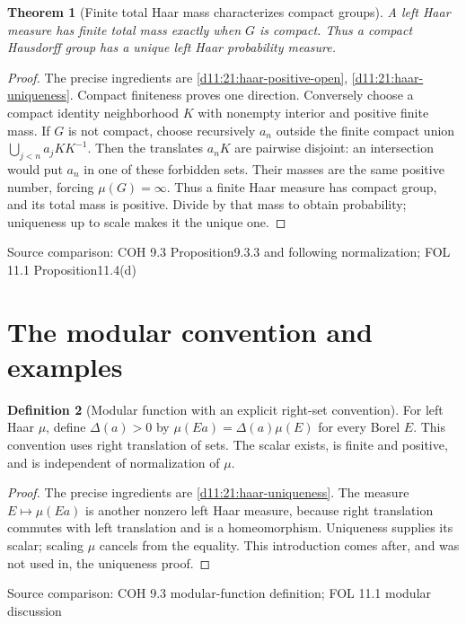 \documentclass[11pt,oneside,openany]{book}
\newtheorem{theorem}{Theorem}[chapter]
\theoremstyle{definition}
\newtheorem{definition}[theorem]{Definition}
\theoremstyle{remark}
\newcommand{\family}[1]{}
\newcommand{\source}[1]{\par\begingroup\small\sffamily\color{black!65}Source comparison: #1\par\endgroup}
\begin{document}
\begin{theorem}[Finite total Haar mass characterizes compact groups]\family{D11.21.haar_finite_iff_compact}\label{d11:21:haar-finite-iff-compact}
A left Haar measure has finite total mass exactly when $G$ is compact. Thus a compact Hausdorff group has a unique left Haar probability measure.
\end{theorem}
\begin{proof}
The precise ingredients are \cref{d11:21:haar-positive-open}, \cref{d11:21:haar-uniqueness}. Compact finiteness proves one direction. Conversely choose a compact identity neighborhood $K$ with nonempty interior and positive finite mass. If $G$ is not compact, choose recursively $a_n$ outside the finite compact union $\bigcup_{j<n}a_jKK^{-1}$. Then the translates $a_nK$ are pairwise disjoint: an intersection would put $a_n$ in one of these forbidden sets. Their masses are the same positive number, forcing $\mu(G)=\infty$. Thus a finite Haar measure has compact group, and its total mass is positive. Divide by that mass to obtain probability; uniqueness up to scale makes it the unique one.
\end{proof}
\source{COH 9.3 Proposition9.3.3 and following normalization; FOL 11.1 Proposition11.4(d)}

\section{The modular convention and examples}

\begin{definition}[Modular function with an explicit right-set convention]\family{D11.21.modular_function}\label{d11:21:modular-function}
For left Haar $\mu$, define $\Delta(a)>0$ by $\mu(Ea)=\Delta(a)\mu(E)$ for every Borel $E$. This convention uses right translation of sets. The scalar exists, is finite and positive, and is independent of normalization of $\mu$.
\end{definition}
\begin{proof}
The precise ingredients are \cref{d11:21:haar-uniqueness}. The measure $E\mapsto\mu(Ea)$ is another nonzero left Haar measure, because right translation commutes with left translation and is a homeomorphism. Uniqueness supplies its scalar; scaling $\mu$ cancels from the equality. This introduction comes after, and was not used in, the uniqueness proof.
\end{proof}
\source{COH 9.3 modular-function definition; FOL 11.1 modular discussion}
\end{document}
